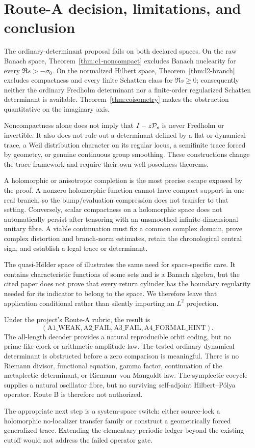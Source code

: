 \section{Route-A decision, limitations, and conclusion}
\label{sec:scope}

The ordinary-determinant proposal fails on both declared spaces.  On the raw
Banach space, Theorem~\ref{thm:c1-noncompact} excludes Banach nuclearity for
every \(\Re s>-\sigma _0\).  On the normalized Hilbert space,
Theorem~\ref{thm:l2-branch} excludes compactness and every finite Schatten
class for \(\Re s\ge0\); consequently neither the ordinary Fredholm
determinant nor a finite-order regularized Schatten determinant is available.
Theorem~\ref{thm:coisometry} makes the obstruction quantitative on the
imaginary axis.

Noncompactness alone does not imply that \(I-z\mathcal P_s\) is never Fredholm or
invertible.  It also does not rule out a determinant defined by a flat or
dynamical trace, a Weil distribution character on its regular locus, a
semifinite trace forced by geometry, or genuine continuous group smoothing.
These constructions change the trace framework and require their own
well-posedness theorems.

A holomorphic or anisotropic completion is the most precise escape exposed
by the proof.  A nonzero holomorphic function cannot have compact support in
one real branch, so the bump/evaluation compression does not transfer to
that setting.  Conversely, scalar compactness on a holomorphic space does
not automatically persist after tensoring with an unsmoothed
infinite-dimensional unitary fibre.  A viable continuation must fix a common
complex domain, prove complex distortion and branch-norm estimates, retain
the chronological central sign, and establish a legal trace or determinant.

The quasi-H\"older space of \citet{aimino2017} illustrates the same need for
space-specific care.  It contains characteristic functions of some sets and
is a Banach algebra, but the cited paper does not prove that every return
cylinder has the boundary regularity needed for its indicator to belong to
the space.  We therefore leave that application conditional rather than
silently importing an \(L^2\) projection.

Under the project's Route-A rubric, the result is
\[
 (\mathrm{A1\_WEAK},\mathrm{A2\_FAIL},
   \mathrm{A3\_FAIL},\mathrm{A4\_FORMAL\_HINT}).
\]
The all-length decoder provides a natural reproducible orbit coding, but no
prime-like clock or arithmetic amplitude law.  The tested ordinary
dynamical determinant is obstructed before a zero comparison is meaningful.
There is no Riemann divisor, functional equation, gamma factor, continuation
of the metaplectic determinant, or Riemann--von Mangoldt law.  The
symplectic cocycle supplies a natural oscillator fibre, but no surviving
self-adjoint Hilbert--P\'olya operator.  Route B is therefore not authorized.

The appropriate next step is a system-space switch: either source-lock a
holomorphic no-localizer transfer family or construct a geometrically forced
generalized trace.  Extending the elementary periodic ledger beyond the
existing cutoff would not address the failed operator gate.
